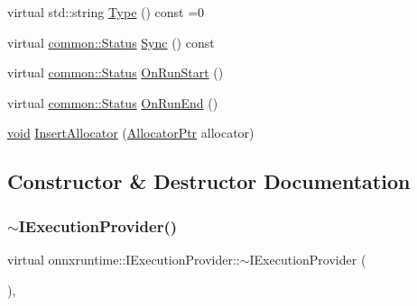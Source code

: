 \begin{DoxyCompactItemize}
$$\item 
virtual std\+::string \mbox{\hyperlink{classonnxruntime_1_1IExecutionProvider_a6bfeb7af172299bcc6083a418b01fac1}{Type}} () const =0
\item 
virtual \mbox{\hyperlink{classonnxruntime_1_1common_1_1Status}{common\+::\+Status}} \mbox{\hyperlink{classonnxruntime_1_1IExecutionProvider_a3657d5ed274547507a7b99d466fa13ef}{Sync}} () const
\item 
virtual \mbox{\hyperlink{classonnxruntime_1_1common_1_1Status}{common\+::\+Status}} \mbox{\hyperlink{classonnxruntime_1_1IExecutionProvider_a0d724b727c4518125b5b154b481bccb3}{On\+Run\+Start}} ()
\item 
virtual \mbox{\hyperlink{classonnxruntime_1_1common_1_1Status}{common\+::\+Status}} \mbox{\hyperlink{classonnxruntime_1_1IExecutionProvider_a2a4b49018ff2509a01c1dd73b5cbb811}{On\+Run\+End}} ()
\item 
\mbox{\hyperlink{mlasi_8h_a88f941d423cb2a819b70a1358982b1a6}{void}} \mbox{\hyperlink{classonnxruntime_1_1IExecutionProvider_a625943e29574b9876f3d7c34e3fe882e}{Insert\+Allocator}} (\mbox{\hyperlink{namespaceonnxruntime_a6cdac724c5dcefded3a63f08dae58fda}{Allocator\+Ptr}} allocator)
\end{DoxyCompactItemize}


\subsection{Constructor \& Destructor Documentation}
\mbox{\label{classonnxruntime_1_1IExecutionProvider_a996806d27429056e13184d5ff4590d24}} 
\subsubsection{\texorpdfstring{$\sim$\+I\+Execution\+Provider()}{~IExecutionProvider()}}
{\footnotesize\ttfamily virtual onnxruntime\+::\+I\+Execution\+Provider\+::$\sim$\+I\+Execution\+Provider (\begin{DoxyParamCaption}{ }\end{DoxyParamCaption})\hspace{0.3cm}{\ttfamily [virtual]}, {\ttfamily [default]}}



